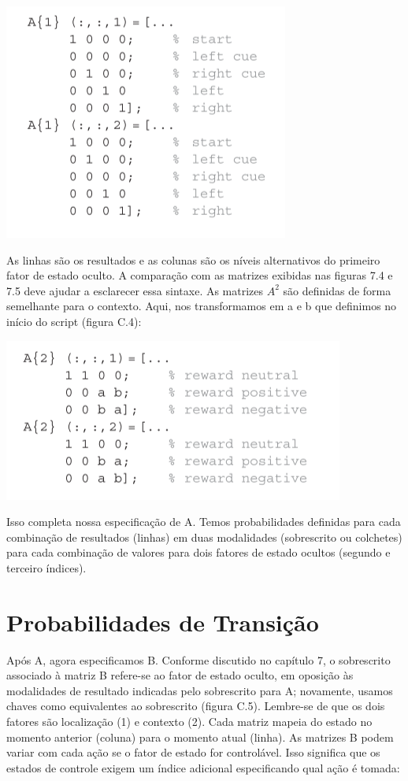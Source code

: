 \documentclass[
  12pt,
]{book}
\begin{document}
\includegraphics{images/Figura_C3.png}

As linhas são os resultados e as colunas são os níveis alternativos do primeiro fator de estado oculto. A comparação com as matrizes exibidas nas figuras 7.4 e 7.5 deve ajudar a esclarecer essa sintaxe. As matrizes \(A^2\) são definidas de forma semelhante para o contexto. Aqui, nos transformamos em a e b que definimos no início do script (figura C.4):

\includegraphics{images/Figura_C4.png}

Isso completa nossa especificação de A. Temos probabilidades definidas para cada combinação de resultados (linhas) em duas modalidades (sobrescrito ou colchetes) para cada combinação de valores para dois fatores de estado ocultos (segundo e terceiro índices).

\hypertarget{probabilidades-de-transiuxe7uxe3o}{%
\section{Probabilidades de Transição}\label{probabilidades-de-transiuxe7uxe3o}}

Após A, agora especificamos B. Conforme discutido no capítulo 7, o sobrescrito associado à matriz B refere-se ao fator de estado oculto, em oposição às modalidades de resultado indicadas pelo sobrescrito para A; novamente, usamos chaves como equivalentes ao sobrescrito (figura C.5). Lembre-se de que os dois fatores são localização (1) e contexto (2). Cada matriz mapeia do estado no momento anterior (coluna) para o momento atual (linha). As matrizes B podem variar com cada ação se o fator de estado for controlável. Isso significa que os estados de controle exigem um índice adicional especificando qual ação é tomada:
\end{document}
